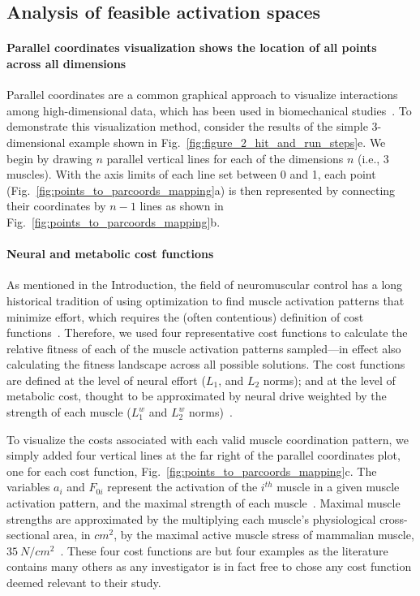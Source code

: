 \documentclass[letterpaper]{article}
\begin{document}
\subsection*{Analysis of feasible activation spaces}
\paragraph*{Parallel coordinates visualization shows the location of all points across all dimensions}

Parallel coordinates are a common graphical approach to visualize interactions among high-dimensional data, which has been used in biomechanical studies~\cite{bachynskyi2013biomechanical, krekel2010visual}.
To demonstrate this visualization method, consider the results of the simple 3-dimensional example shown in Fig.~\ref{fig:figure_2_hit_and_run_steps}e. We begin by drawing $n$ parallel vertical lines for each of the dimensions $n$ (i.e., 3 muscles).
With the axis limits of each line set between 0 and 1, each point (Fig.~\ref{fig:points_to_parcoords_mapping}a) is then represented by connecting their coordinates by $n-1$ lines as shown in Fig.~\ref{fig:points_to_parcoords_mapping}b.

\paragraph*{Neural and metabolic cost functions}

As mentioned in the Introduction, the field of neuromuscular control has a long historical tradition of using optimization to find muscle activation patterns that minimize effort, which requires the (often contentious) definition of cost functions~\cite{spoor1983balancing,Chao1978Graphical,Prilutsky2000Muscle,crowninshield1981physiologically}. Therefore, we used four representative cost functions to calculate the relative fitness of each of the muscle activation patterns sampled---in effect also calculating the fitness landscape across all possible solutions. The cost functions are defined at the level of neural effort ($L_1$, and $L_2$ norms); and at the level of metabolic cost, thought to be approximated by neural drive weighted by the strength of each muscle ($L_1^w$ and $L_2^w$ norms)~\cite{Prilutsky2000Muscle,crowninshield1981physiologically}.

To visualize the costs associated with each valid muscle coordination pattern, we simply added four vertical lines at the far right of the parallel coordinates plot, one for each cost function, Fig.~\ref{fig:points_to_parcoords_mapping}c. The variables $a_i$ and $F_{0i}$ represent the activation of the $i^{th}$ muscle in a given muscle activation pattern, and the maximal strength of each muscle~\cite{Prilutsky2000Muscle,crowninshield1981physiologically}. Maximal muscle strengths are approximated by the multiplying each muscle's physiological cross-sectional area, in $cm^2$, by the maximal active muscle stress of mammalian muscle, $35~N/{cm^2}$~\cite{Zajac1993Muscle}. These four cost functions are but four examples as the literature contains many others as any investigator is in fact free to chose any cost function deemed relevant to their study.
\end{document}
